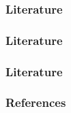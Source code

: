 \documentclass[11pt]{beamer}
\begin{document}
\begin{frame}[t]
    \begin{itemize}
 \frametitle{Literature}
     \end{itemize}
    \note{~}
\end{frame}

\begin{frame}[t]
    \begin{itemize}
 \frametitle{Literature}
     \end{itemize}
    \note{~}
\end{frame}

\begin{frame}[t]
    \begin{itemize}
 \frametitle{Literature}
     \end{itemize}
    \note{~}
\end{frame}



 {
    \begin{frame}
        \frametitle{}
    \end{frame}

}

\begin{frame}[allowframebreaks]
    \frametitle{References}
    
    \renewcommand{\bibfont}{\normalfont\footnotesize}
    \printbibliography
    
    
\end{frame}
\end{document}
